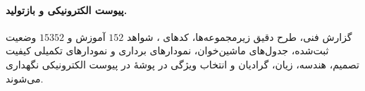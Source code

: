 \paragraph{پیوست الکترونیکی و بازتولید.}
گزارش فنی، طرح دقیق
زیرمجموعه‌ها، کدهای
، شواهد
$152$ آموزش و
$15352$ وضعیت ثبت‌شده،
جدول‌های ماشین‌خوان،
نمودارهای برداری و
نمودارهای تکمیلی
کیفیت تصمیم، هندسه،
زیان، گرادیان و
انتخاب ویژگی
در پوشهٔ
در پیوست الکترونیکی
نگهداری می‌شوند.
